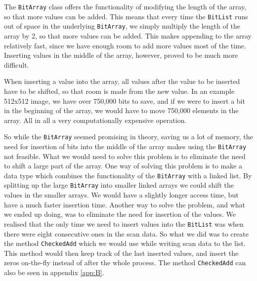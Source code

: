 The \lstinline|BitArray| class offers the functionality of modifying the length of the array, so that more values can be added.
This means that every time the \lstinline|BitList| runs out of space in the underlying \lstinline|BitArray|, we simply multiply the length of the array by 2, so that more values can be added.
This makes appending to the array relatively fast, since we have enough room to add more values most of the time.
Inserting values in the middle of the array, however, proved to be much more difficult.

When inserting a value into the array, all values after the value to be inserted have to be shifted, so that room is made from the new value.
In an example 512x512 image, we have over 750,000 bits to save, and if we were to insert a bit in the beginning of the array, we would have to move 750,000 elements in the array.
All in all a very computationally expensive operation.

So while the \lstinline|BitArray| seemed promising in theory, saving us a lot of memory, the need for insertion of bits into the middle of the array makes using the \lstinline|BitArray| not feasible.
What we would need to solve this problem is to eliminate the need to shift a large part of the array. 
One way of solving this problem is to make a data type which combines the functionality of the \lstinline|BitArray| with a linked list. 
By splitting up the large \lstinline|BitArray| into smaller linked arrays we could shift the values in the smaller arrays. 
We would have a slightly longer access time, but have a much faster insertion time. 
Another way to solve the problem, and what we ended up doing, was to eliminate the need for insertion of the values. 
We realised that the only time we need to insert values into the \lstinline|BitList| was when there were eight consecutive ones in the scan data. 
So what we did was to create the method \lstinline|CheckedAdd| which we would use while writing scan data to the list. 
This method would then keep track of the last inserted values, and insert the zeros on-the-fly instead of after the whole process. 
The method \lstinline|CheckedAdd| can also be seen in appendix \ref{app:B}.